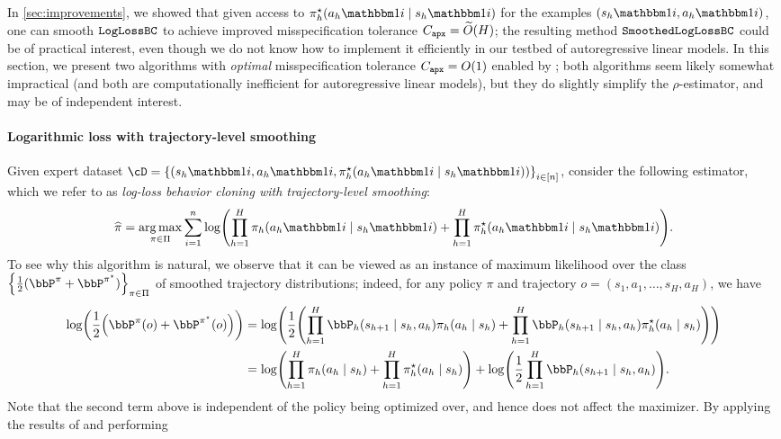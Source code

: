 
In \cref{sec:improvements}, we showed that given access to
\densobs $\pistar_h(a_h\ind{i}\mid{}s_h\ind{i})$ for the examples
$(s_h\ind{i},a_h\ind{i})$, one can smooth $\texttt{LogLossBC}$ to achieve improved
misspecification tolerance $C_{\texttt{apx}}=\widetilde{O}(H)$; the resulting method $\texttt{SmoothedLogLossBC}$ could be of practical interest, even though we do not know how to implement it efficiently in our testbed of autoregressive linear models. In this section, we
present two algorithms with \emph{optimal} misspecification tolerance
$C_{\texttt{apx}}=O(1)$ enabled by \densobs; both algorithms seem likely somewhat impractical (and both are
computationally inefficient for autoregressive linear models), but they do slightly simplify the $\rho$-estimator,
and may be of independent interest.

\paragraph{Logarithmic loss with trajectory-level smoothing}
Given expert dataset
$\cD=\crl*{(s_h\ind{i},a_h\ind{i},\pistar_h(a_h\ind{i}\mid{}s_h\ind{i}))}_{i\in\brk{n}}$,
consider the following estimator, which we refer to as
\emph{log-loss behavior cloning with trajectory-level smoothing}:
\begin{align}
  \label{eq:traj_smoothing}
  \pihat=\argmax_{\pi\in\Pi}\sum_{i=1}^{n}\log\prn*{\prod_{h=1}^{H}\pi_h(a_h\ind{i}\mid{}s_h\ind{i})
  + \prod_{h=1}^{H}\pistar_h(a_h\ind{i}\mid{}s_h\ind{i})}.
\end{align}
To see why this algorithm is natural, we observe that it can be viewed
as an instance of maximum likelihood over the class
$\crl*{\frac{1}{2}(\bbP^{\pi}+\bbP^{\pistar})}_{\pi\in\Pi}$ of
smoothed trajectory distributions; indeed, for any policy $\pi$ and trajectory $o = (s_1,a_1,\dots,s_H,a_H)$, we have
%
\begin{align}
  \log\prn*{\frac{1}{2}\prn*{\bbP^{\pi}(o) + \bbP^{\pistar}(o)}}%
  &=\log\prn*{\frac{1}{2}\prn*{\prod_{h=1}^{H}\bbP_h(s_{h+1}\mid{}s_h,a_h)\pi_h(a_h\mid{}s_h)
  +
    \prod_{h=1}^{H}\bbP_h(s_{h+1}\mid{}s_h,a_h)\pistar_h(a_h\mid{}s_h)}}\\
  &=\log\prn*{\prod_{h=1}^{H}\pi_h(a_h\mid{}s_h)
    + \prod_{h=1}^{H}\pistar_h(a_h\mid{}s_h)}
    + \log\prn*{\frac{1}{2}\prod_{h=1}^{H}\bbP_h(s_{h+1}\mid{}s_h,a_h)}.\label{eq:traj_equiv}
\end{align}%
%
Note that the second term above is independent of the policy being
optimized over, and hence does not affect the maximizer. By applying the results of \citet{foster2024behavior} and performing
